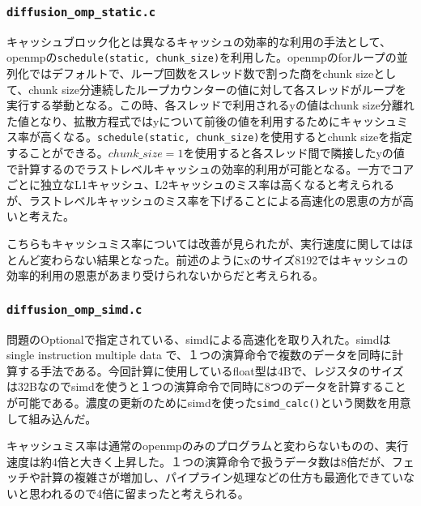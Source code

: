 \documentclass{jarticle}
\begin{document}
\subsubsection{\texttt{diffusion\_omp\_static.c}}
キャッシュブロック化とは異なるキャッシュの効率的な利用の手法として、openmpの\texttt{schedule(static, chunk\_size)}を利用した。openmpのforループの並列化ではデフォルトで、ループ回数をスレッド数で割った商をchunk sizeとして、chunk size分連続したループカウンターの値に対して各スレッドがループを実行する挙動となる。この時、各スレッドで利用されるyの値はchunk size分離れた値となり、拡散方程式ではyについて前後の値を利用するためにキャッシュミス率が高くなる。\texttt{schedule(static, chunk\_size)}を使用するとchunk sizeを指定することができる。$chunk\_size=1$を使用すると各スレッド間で隣接したyの値で計算するのでラストレベルキャッシュの効率的利用が可能となる。一方でコアごとに独立なL1キャッシュ、L2キャッシュのミス率は高くなると考えられるが、ラストレベルキャッシュのミス率を下げることによる高速化の恩恵の方が高いと考えた。\par
こちらもキャッシュミス率については改善が見られたが、実行速度に関してはほとんど変わらない結果となった。前述のようにxのサイズ8192ではキャッシュの効率的利用の恩恵があまり受けられないからだと考えられる。


\subsubsection{\texttt{diffusion\_omp\_simd.c}}
問題のOptionalで指定されている、simdによる高速化を取り入れた。simdは single instruction multiple data で、１つの演算命令で複数のデータを同時に計算する手法である。今回計算に使用しているfloat型は4Bで、レジスタのサイズは32Bなのでsimdを使うと１つの演算命令で同時に8つのデータを計算することが可能である。濃度の更新のためにsimdを使った\texttt{simd\_calc()}という関数を用意して組み込んだ。\par
キャッシュミス率は通常のopenmpのみのプログラムと変わらないものの、実行速度は約4倍と大きく上昇した。１つの演算命令で扱うデータ数は8倍だが、フェッチや計算の複雑さが増加し、パイプライン処理などの仕方も最適化できていないと思われるので4倍に留まったと考えられる。
\end{document}
